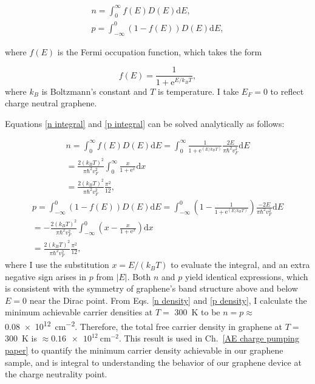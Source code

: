 \documentclass[double,12pt,1in,seploa]{beavtex}
\begin{document}
\begin{gather}
        n = \int_{0}^{\infty}f(E) D(E)\mathrm{d}E, \label{n integral} \\ 
        p = \int_{-\infty}^{0}(1- f(E)) D(E)\mathrm{d}E, \label{p integral}
\end{gather}

where $f(E)$ is the Fermi occupation function, which takes the form

\begin{equation}
    f(E) = \frac{1}{1+\mathrm{e}^{E/k_B T}},
\end{equation}
where $k_B$ is Boltzmann's constant and $T$ is temperature. I take $E_F = 0$ to reflect charge neutral graphene. 

Equations \ref{n integral} and \ref{p integral} can be solved analytically as follows:

\begin{equation}
    \begin{split}
        n = \int_{0}^{\infty}f(E) D(E)\mathrm{d}E 
        = \int_{0}^{\infty}\frac{1}{1+\mathrm{e}^{(E/k_B T)}} \frac{2E}{\pi \hbar^2 v_F^2}\mathrm{d}E \\
        = \frac{2(k_B T)^2}{\pi \hbar^2 v_F^2}\int_{0}^{\infty}\frac{x}{1+\mathrm{e}^{x}}\mathrm{d}x \\
        = \frac{2(k_B T)^2}{\pi\hbar^2 v_F^2} \frac{\pi^2}{12}, \label{n density}
    \end{split}
\end{equation}
\begin{equation}
    \begin{split}
        p = \int_{-\infty}^{0}(1-f(E)) D(E)\mathrm{d}E 
        = \int_{-\infty}^{0}\left( 1 -\frac{1}{1+\mathrm{e}^{(E/k_B T)}} \right) \frac{-2E}{\pi \hbar^2 v_F^2}\mathrm{d}E \\
        = -\frac{2(k_B T)^2}{\pi \hbar^2 v_F^2}\int_{-\infty}^{0}\left(x - \frac{x}{1+\mathrm{e}^{x}}\right)\mathrm{d}x \\
        = \frac{2(k_B T)^2}{\pi\hbar^2 v_F^2} \frac{\pi^2}{12}, \label{p density}
    \end{split}
\end{equation}
where I use the substitution $x = E/(k_B T)$ to evaluate the integral, and an extra negative sign arises in $p$ from $|E|$. Both $n$ and $p$ yield identical expressions, which is consistent with the symmetry of graphene's band structure above and below $E = 0$ near the Dirac point. From Eqs. \ref{n density} and \ref{p density}, I calculate the minimum achievable carrier densities at $T = $ \SI{300}{\kelvin} to be $n = p \approx $\SI{0.08e12}{\centi\meter^{-2}}. Therefore, the total free carrier density in graphene at $T = $ \SI{300}{\kelvin} is $\approx \SI{0.16e12}{\centi\meter^{-2}}$. This result is used in Ch.\ \ref{AE charge pumping paper} to quantify the minimum carrier density achievable in our graphene sample, and is integral to understanding the behavior of our graphene device at the charge neutrality point.
\end{document}
